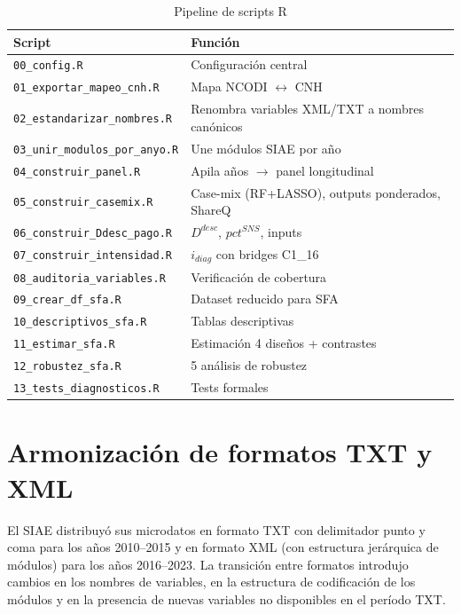 \documentclass[12pt, a4paper, twoside, openright]{book}
\theoremstyle{plain}
\theoremstyle{definition}
\theoremstyle{remark}
\begin{document}
\begin{table}[htbp]
\centering
\caption{Pipeline de scripts R}
\label{tab:pipeline}
\small
\begin{tabular}{p{4cm}p{9cm}}
\toprule
\textbf{Script} & \textbf{Función} \\
\midrule
\texttt{00\_config.R} & Configuración central \\
\texttt{01\_exportar\_mapeo\_cnh.R} & Mapa NCODI $\leftrightarrow$ CNH \\
\texttt{02\_estandarizar\_nombres.R} & Renombra variables XML/TXT a nombres canónicos \\
\texttt{03\_unir\_modulos\_por\_anyo.R} & Une módulos SIAE por año \\
\texttt{04\_construir\_panel.R} & Apila años $\rightarrow$ panel longitudinal \\
\texttt{05\_construir\_casemix.R} & Case-mix (RF+LASSO), outputs ponderados, ShareQ \\
\texttt{06\_construir\_Ddesc\_pago.R} & $D^{desc}$, $pct^{SNS}$, inputs \\
\texttt{07\_construir\_intensidad.R} & $i_{diag}$ con bridges C1\_16 \\
\texttt{08\_auditoria\_variables.R} & Verificación de cobertura \\
\texttt{09\_crear\_df\_sfa.R} & Dataset reducido para SFA \\
\texttt{10\_descriptivos\_sfa.R} & Tablas descriptivas \\
\texttt{11\_estimar\_sfa.R} & Estimación 4 diseños + contrastes \\
\texttt{12\_robustez\_sfa.R} & 5 análisis de robustez \\
\texttt{13\_tests\_diagnosticos.R} & Tests formales \\
\bottomrule
\end{tabular}
\end{table}

\section{Armonización de formatos TXT y XML}
\label{sec:armonizacion_txt_xml_b}

El SIAE distribuyó sus microdatos en formato TXT con delimitador punto y coma para los años 2010--2015 y en formato XML (con estructura jerárquica de módulos) para los años 2016--2023. La transición entre formatos introdujo cambios en los nombres de variables, en la estructura de codificación de los módulos y en la presencia de nuevas variables no disponibles en el período TXT.
\end{document}
